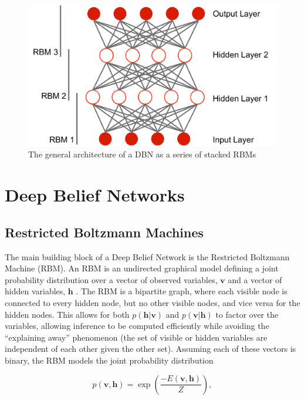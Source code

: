 \documentclass{article}
\begin{document}
\begin{figure}[ht]
\vskip 0.2in
\begin{center}
\centerline{\includegraphics[width=\columnwidth]{images/deep_network_arch.pdf}}
\caption{The general architecture of a DBN as a series of stacked RBMs}
\label{dbn-arch}
\end{center}
\vskip -0.2in
\end{figure}

\section{Deep Belief Networks}
\label{sec:DBN}

\subsection{Restricted Boltzmann Machines}

The main building block of a Deep Belief Network is the Restricted Boltzmann
Machine (RBM). An RBM is an undirected graphical model defining a joint
probability distribution over a vector of observed variables, $\mathbf{v}$ and
a vector of hidden variables, $\mathbf{h}$ \cite{mnih2012conditional}. The RBM
is a bipartite graph, where each visible node is connected to every hidden
node, but no other visible nodes, and vice versa for the hidden nodes. This
allows for both $p(\mathbf{h}|\mathbf{v})$ and $p(\mathbf{v}|\mathbf{h})$ to
factor over the variables, allowing inference to be computed efficiently while
avoiding the ``explaining away'' phenomenon (the set of visible or hidden
variables are independent of each other given the other set). Assuming each of
these vectors is binary, the RBM models the joint probability distribution

\[
  p \left( \mathbf{v}, \mathbf{h} \right) = 
  \exp \left(\dfrac{-E \left( \mathbf{v}, \mathbf{h} \right)}{Z}\right),
\]
\end{document}
